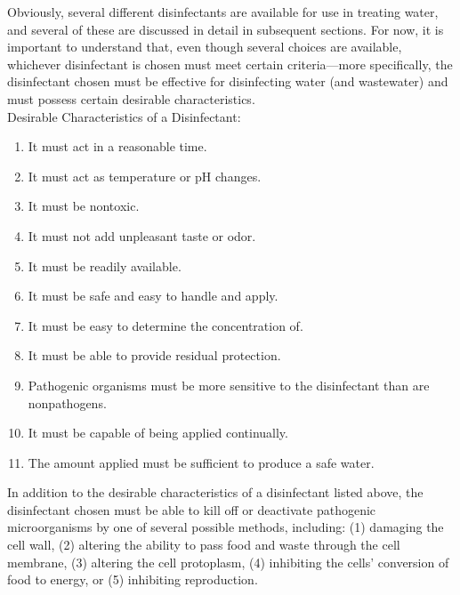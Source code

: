 \documentclass{article}
\begin{document}
Obviously, several different disinfectants are available for use in treating water, and several of these are discussed in detail in subsequent sections. For now, it is important to understand that, even though several choices are available, whichever disinfectant is chosen must meet certain criteria—more specifically, the disinfectant chosen must be effective for disinfecting water (and wastewater) and must possess certain desirable characteristics.\\
Desirable Characteristics of a Disinfectant:
\begin{enumerate}
\item It must act in a reasonable time.
\item It must act as temperature or pH changes.
\item It must be nontoxic.
\item It must not add unpleasant taste or odor.
\item It must be readily available.
\item It must be safe and easy to handle and apply.
\item It must be easy to determine the concentration of.
\item It must be able to provide residual protection.
\item Pathogenic organisms must be more sensitive to the disinfectant than are nonpathogens.
\item It must be capable of being applied continually.
\item The amount applied must be sufficient to produce a safe water.
\end{enumerate}
In addition to the desirable characteristics of a disinfectant listed above, the disinfectant chosen must be able to kill off or deactivate pathogenic microorganisms by one of several possible methods, including: (1) damaging the cell wall, (2) altering the ability to pass food and waste through the cell membrane, (3) altering the cell protoplasm,
(4) inhibiting the cells’ conversion of food to energy, or (5) inhibiting reproduction.\\
\end{document}
